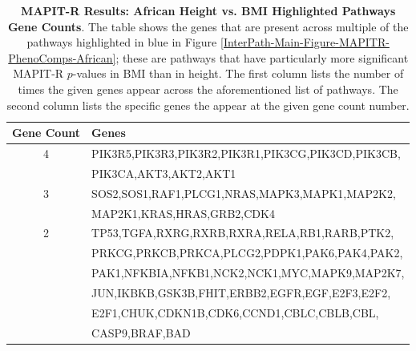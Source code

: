 \documentclass[12pt, a4paper]{article}
\begin{document}
\begin{table}[ht]
\centering
\begin{tabular}{cl}
  \hline
 \textbf{Gene Count} & \textbf{Genes} \\
  \hline
  4 & PIK3R5,PIK3R3,PIK3R2,PIK3R1,PIK3CG,PIK3CD,PIK3CB, \\
  & PIK3CA,AKT3,AKT2,AKT1 \\
  3 & SOS2,SOS1,RAF1,PLCG1,NRAS,MAPK3,MAPK1,MAP2K2, \\
  & MAP2K1,KRAS,HRAS,GRB2,CDK4 \\
  2 & TP53,TGFA,RXRG,RXRB,RXRA,RELA,RB1,RARB,PTK2, \\
  & PRKCG,PRKCB,PRKCA,PLCG2,PDPK1,PAK6,PAK4,PAK2, \\
  & PAK1,NFKBIA,NFKB1,NCK2,NCK1,MYC,MAPK9,MAP2K7, \\ 
  & JUN,IKBKB,GSK3B,FHIT,ERBB2,EGFR,EGF,E2F3,E2F2, \\
  & E2F1,CHUK,CDKN1B,CDK6,CCND1,CBLC,CBLB,CBL, \\
  & CASP9,BRAF,BAD \\
   \hline
\end{tabular}
\caption[TBD]{\textbf{MAPIT-R Results: African Height vs. BMI Highlighted Pathways Gene Counts}. The table shows the genes that are present across multiple of the pathways highlighted in blue in Figure \ref{InterPath-Main-Figure-MAPITR-PhenoComps-African}; these are pathways that have particularly more significant MAPIT-R $p$-values in BMI than in height. The first column lists the number of times the given genes appear across the aforementioned list of pathways. The second column lists the specific genes the appear at the given gene count number.}
\label{InterPath-Supp-Table-MAPITR-PhenoComps-African-GeneCounts}
\end{table}
\clearpage

\end{document}
